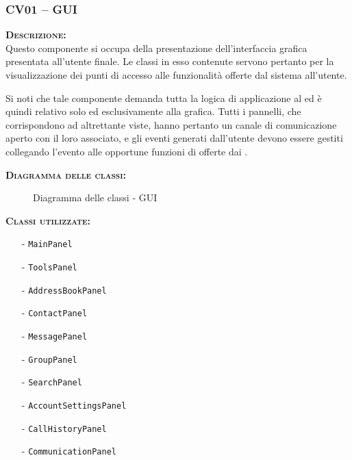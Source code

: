 \subsubsection{CV01 -- GUI}\label{sec:cv01}
\begin{description}
	\item{\scshape\bfseries Descrizione:}\\
Questo componente si occupa della presentazione dell'interfaccia grafica presentata all'utente finale. Le classi in esso contenute servono pertanto per la visualizzazione dei punti di accesso alle funzionalità offerte dal sistema all'utente.

Si noti che tale componente demanda tutta la logica di applicazione al  ed è quindi relativo solo ed esclusivamente alla grafica. Tutti i pannelli, che corrispondono ad altrettante viste, hanno pertanto un canale di comunicazione aperto con il  loro associato, e gli eventi generati dall'utente devono essere gestiti collegando l'evento alle opportune funzioni di  offerte dai .

	\item{\scshape\bfseries Diagramma delle classi:}
  \begin{figure}[H]
    \centering
    \caption{Diagramma delle classi - GUI}\label{fig:gui}
  \end{figure}

	\item{\scshape\bfseries Classi utilizzate:} 
	\begin{itemize}[noitemsep,nolistsep]
		\item[-] \texttt{MainPanel}
		\item[-] \texttt{ToolsPanel}
		\item[-] \texttt{AddressBookPanel}
		\item[-] \texttt{ContactPanel}
		\item[-] \texttt{MessagePanel}
		\item[-] \texttt{GroupPanel}
		\item[-] \texttt{SearchPanel}
		\item[-] \texttt{AccountSettingsPanel}
		\item[-] \texttt{CallHistoryPanel}
		\item[-] \texttt{CommunicationPanel}
	\end{itemize}  
\end{description}

